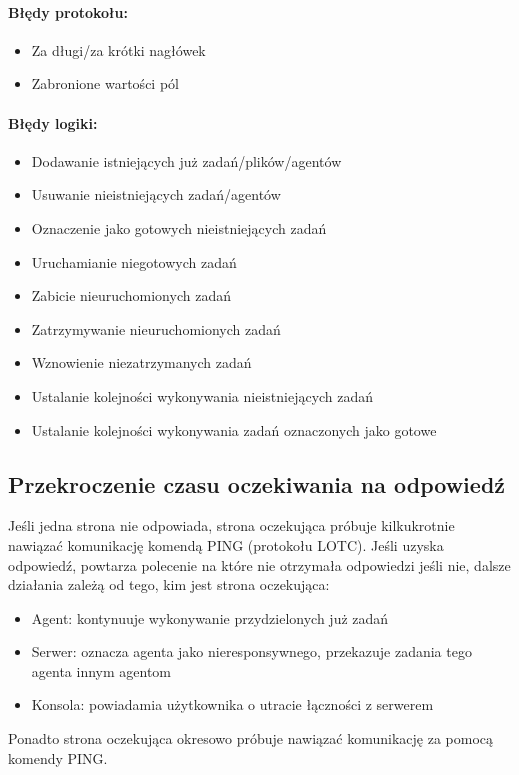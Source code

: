 \documentclass[10pt,a4paper]{article}
\begin{document}
            \paragraph{Błędy protokołu:}
            
            \begin{itemize}
	            \item Za długi/za krótki nagłówek
	            \item Zabronione wartości pól 
            \end{itemize}
            
            \paragraph{Błędy logiki:}
            
            \begin{itemize}
	            \item Dodawanie istniejących już zadań/plików/agentów
	            \item Usuwanie nieistniejących zadań/agentów
	            \item Oznaczenie jako gotowych nieistniejących zadań
	            \item Uruchamianie niegotowych zadań
	            \item Zabicie nieuruchomionych zadań
	            \item Zatrzymywanie nieuruchomionych zadań
	            \item Wznowienie niezatrzymanych zadań
	            \item Ustalanie kolejności wykonywania nieistniejących zadań
	            \item Ustalanie kolejności wykonywania zadań oznaczonych jako gotowe
            \end{itemize}
            
		\subsection{Przekroczenie czasu oczekiwania na odpowiedź}
            Jeśli jedna strona nie odpowiada, strona oczekująca próbuje kilkukrotnie nawiązać komunikację komendą PING (protokołu LOTC). Jeśli uzyska odpowiedź, powtarza polecenie na które nie otrzymała odpowiedzi jeśli nie, dalsze działania zależą od tego, kim jest strona oczekująca:
            \begin{itemize}
	            \item Agent: kontynuuje wykonywanie przydzielonych już zadań
	            \item Serwer: oznacza agenta jako nieresponsywnego, przekazuje zadania tego agenta innym agentom
	            \item Konsola: powiadamia użytkownika o utracie łączności z serwerem
            \end{itemize}
            Ponadto strona oczekująca okresowo próbuje nawiązać komunikację za pomocą komendy PING.
            
\end{document}
